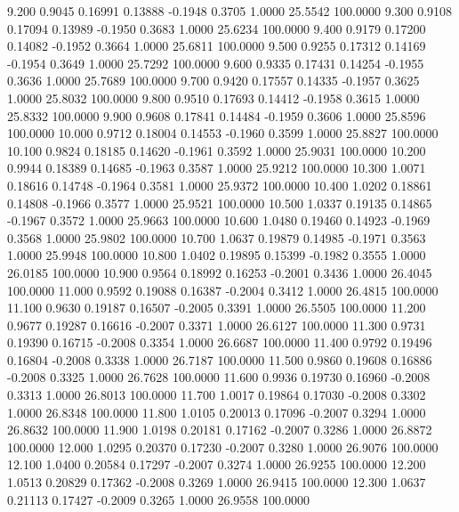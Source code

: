    9.200   0.9045   0.16991   0.13888  -0.1948   0.3705   1.0000  25.5542 100.0000
   9.300   0.9108   0.17094   0.13989  -0.1950   0.3683   1.0000  25.6234 100.0000
   9.400   0.9179   0.17200   0.14082  -0.1952   0.3664   1.0000  25.6811 100.0000
   9.500   0.9255   0.17312   0.14169  -0.1954   0.3649   1.0000  25.7292 100.0000
   9.600   0.9335   0.17431   0.14254  -0.1955   0.3636   1.0000  25.7689 100.0000
   9.700   0.9420   0.17557   0.14335  -0.1957   0.3625   1.0000  25.8032 100.0000
   9.800   0.9510   0.17693   0.14412  -0.1958   0.3615   1.0000  25.8332 100.0000
   9.900   0.9608   0.17841   0.14484  -0.1959   0.3606   1.0000  25.8596 100.0000
  10.000   0.9712   0.18004   0.14553  -0.1960   0.3599   1.0000  25.8827 100.0000
  10.100   0.9824   0.18185   0.14620  -0.1961   0.3592   1.0000  25.9031 100.0000
  10.200   0.9944   0.18389   0.14685  -0.1963   0.3587   1.0000  25.9212 100.0000
  10.300   1.0071   0.18616   0.14748  -0.1964   0.3581   1.0000  25.9372 100.0000
  10.400   1.0202   0.18861   0.14808  -0.1966   0.3577   1.0000  25.9521 100.0000
  10.500   1.0337   0.19135   0.14865  -0.1967   0.3572   1.0000  25.9663 100.0000
  10.600   1.0480   0.19460   0.14923  -0.1969   0.3568   1.0000  25.9802 100.0000
  10.700   1.0637   0.19879   0.14985  -0.1971   0.3563   1.0000  25.9948 100.0000
  10.800   1.0402   0.19895   0.15399  -0.1982   0.3555   1.0000  26.0185 100.0000
  10.900   0.9564   0.18992   0.16253  -0.2001   0.3436   1.0000  26.4045 100.0000
  11.000   0.9592   0.19088   0.16387  -0.2004   0.3412   1.0000  26.4815 100.0000
  11.100   0.9630   0.19187   0.16507  -0.2005   0.3391   1.0000  26.5505 100.0000
  11.200   0.9677   0.19287   0.16616  -0.2007   0.3371   1.0000  26.6127 100.0000
  11.300   0.9731   0.19390   0.16715  -0.2008   0.3354   1.0000  26.6687 100.0000
  11.400   0.9792   0.19496   0.16804  -0.2008   0.3338   1.0000  26.7187 100.0000
  11.500   0.9860   0.19608   0.16886  -0.2008   0.3325   1.0000  26.7628 100.0000
  11.600   0.9936   0.19730   0.16960  -0.2008   0.3313   1.0000  26.8013 100.0000
  11.700   1.0017   0.19864   0.17030  -0.2008   0.3302   1.0000  26.8348 100.0000
  11.800   1.0105   0.20013   0.17096  -0.2007   0.3294   1.0000  26.8632 100.0000
  11.900   1.0198   0.20181   0.17162  -0.2007   0.3286   1.0000  26.8872 100.0000
  12.000   1.0295   0.20370   0.17230  -0.2007   0.3280   1.0000  26.9076 100.0000
  12.100   1.0400   0.20584   0.17297  -0.2007   0.3274   1.0000  26.9255 100.0000
  12.200   1.0513   0.20829   0.17362  -0.2008   0.3269   1.0000  26.9415 100.0000
  12.300   1.0637   0.21113   0.17427  -0.2009   0.3265   1.0000  26.9558 100.0000
